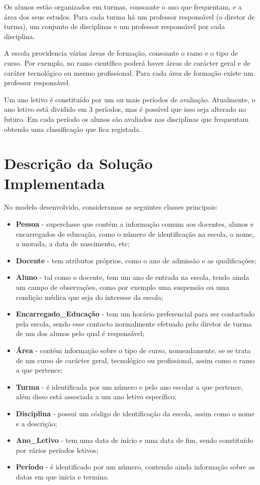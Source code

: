 \documentclass[12pt,a4paper,reqno]{report}
\numberwithin{figure}{section}
\numberwithin{equation}{section}
\begin{document}
Os alunos estão organizados em turmas, consoante o ano que frequentam, e a área dos seus estudos. Para cada turma há um professor responsável (o diretor de turma), um conjunto de disciplinas e um professor responsável por cada disciplina.

A escola providencia várias áreas de formação, consoante o ramo e o tipo de curso. Por exemplo, no ramo científico poderá haver áreas de carácter geral e de caráter tecnológico ou mesmo profissional. Para cada área de formação existe um professor responsável.

Um ano letivo é constituído por um ou mais períodos de avaliação. Atualmente, o ano letivo está dividido em 3 períodos, mas é possível que isso seja alterado no futuro. Em cada período os alunos são avaliados nas disciplinas que frequentam obtendo uma classificação que fica registada.

\chapter{Descrição da Solução Implementada}

No modelo desenvolvido, consideramos as seguintes classes principais:
\begin{itemize}
\item \textbf{Pessoa} - superclasse que contém a informação comum aos docentes, alunos e encarregados de educação, como o número de identificação na escola, o nome, a morada, a data de nascimento, etc;
\item \textbf{Docente} - tem atributos próprios, como o ano de admissão e as qualificações;
\item \textbf{Aluno} - tal como o docente, tem um ano de entrada na escola, tendo ainda um campo de observações, como por exemplo uma suspensão ou uma condição médica que seja do interesse da escola;
\item \textbf{Encarregado\_Educação} - tem um horário preferencial para ser contactado pela escola, sendo esse contacto normalmente efetuado pelo diretor de turma de um dos alunos pelo qual é responsável;
\item \textbf{Área} - contém informação sobre o tipo de curso, nomeadamente, se se trata de um curso de carácter geral, tecnológico ou profissional, assim como o ramo a que pertence;
\item \textbf{Turma} - é identificada por um número e pelo ano escolar a que pertence, além disso está associada a um ano letivo específico;
\item \textbf{Disciplina} - possui um código de identificação da escola, assim como o nome e a descrição;
\item \textbf{Ano\_Letivo} - tem uma data de início e uma data de fim, sendo constituído por vários períodos letivos;
\item \textbf{Período} - é identificado por um número, contendo ainda informação sobre as datas em que inicia e termina.
\end{itemize}
\end{document}
